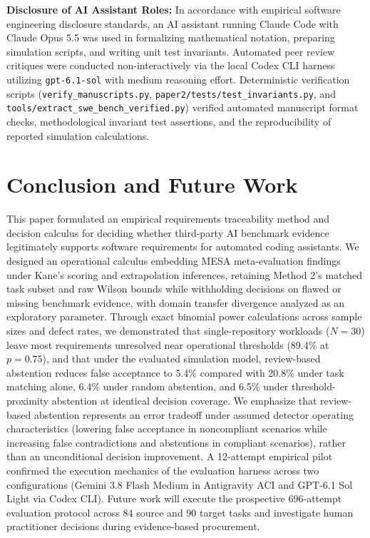 \documentclass[runningheads]{llncs}
\begin{document}
\textbf{Disclosure of AI Assistant Roles:} In accordance with empirical software engineering disclosure standards, an AI assistant running Claude Code with Claude Opus 5.5 was used in formalizing mathematical notation, preparing simulation scripts, and writing unit test invariants. Automated peer review critiques were conducted non-interactively via the local Codex CLI harness utilizing \texttt{gpt-6.1-sol} with medium reasoning effort. Deterministic verification scripts (\texttt{verify\_manuscripts.py}, \texttt{paper2/tests/test\_invariants.py}, and \texttt{tools/extract\_swe\_bench\_verified.py}) verified automated manuscript format checks, methodological invariant test assertions, and the reproducibility of reported simulation calculations.

\section{Conclusion and Future Work}
\label{sec:conclusion}

This paper formulated an empirical requirements traceability method and decision calculus for deciding whether third-party AI benchmark evidence legitimately supports software requirements for automated coding assistants. We designed an operational calculus embedding MESA meta-evaluation findings under Kane's scoring and extrapolation inferences, retaining Method 2's matched task subset and raw Wilson bounds while withholding decisions on flawed or missing benchmark evidence, with domain transfer divergence analyzed as an exploratory parameter. Through exact binomial power calculations across sample sizes and defect rates, we demonstrated that single-repository workloads ($N = 30$) leave most requirements unresolved near operational thresholds (89.4\% at $p = 0.75$), and that under the evaluated simulation model, review-based abstention reduces false acceptance to 5.4\% compared with 20.8\% under task matching alone, 6.4\% under random abstention, and 6.5\% under threshold-proximity abstention at identical decision coverage. We emphasize that review-based abstention represents an error tradeoff under assumed detector operating characteristics (lowering false acceptance in noncompliant scenarios while increasing false contradictions and abstentions in compliant scenarios), rather than an unconditional decision improvement. A 12-attempt empirical pilot confirmed the execution mechanics of the evaluation harness across two configurations (Gemini 3.8 Flash Medium in Antigravity ACI and GPT-6.1 Sol Light via Codex CLI). Future work will execute the prospective 696-attempt evaluation protocol across 84 source and 90 target tasks and investigate human practitioner decisions during evidence-based procurement.
\end{document}
